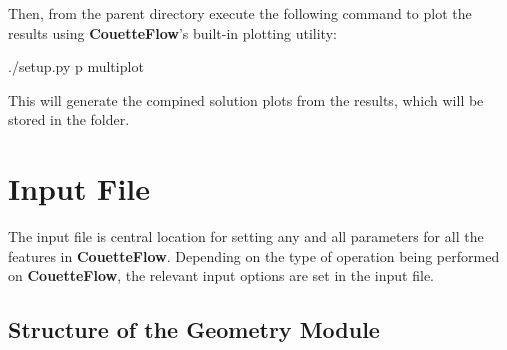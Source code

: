 \documentclass[letterpaper,10pt,english]{sphinxmanual}
\begin{document}
Then, from the parent directory execute the following command to plot the results using {\color{red}\bfseries{}\textbar{}CouetteFlow\textbar{}}’s built-in plotting utility:

\begin{sphinxVerbatim}[commandchars=\\\{\}]
\PYGZdl{} ./setup.py \PYGZhy{}p multi\PYGZus{}plot
\end{sphinxVerbatim}

This will generate the compined solution plots from the results, which will be stored in the  folder.


\section{Input File}
\label{\detokenize{inputfile::doc}}\label{\detokenize{inputfile:input-file}}\label{\detokenize{inputfile:inputfile}}
The input file is central location for setting any and all parameters for all the features in {\color{red}\bfseries{}\textbar{}CouetteFlow\textbar{}}. Depending on the type of operation being performed on {\color{red}\bfseries{}\textbar{}CouetteFlow\textbar{}}, the relevant input options are set in the input file.


\subsection{Structure of the Geometry Module}
\label{\detokenize{inputfile:str-geometry}}\label{\detokenize{inputfile:structure-of-the-geometry-module}}
\begin{sphinxVerbatim}[commandchars=\\\{\}]
\end{sphinxVerbatim}
\end{document}
